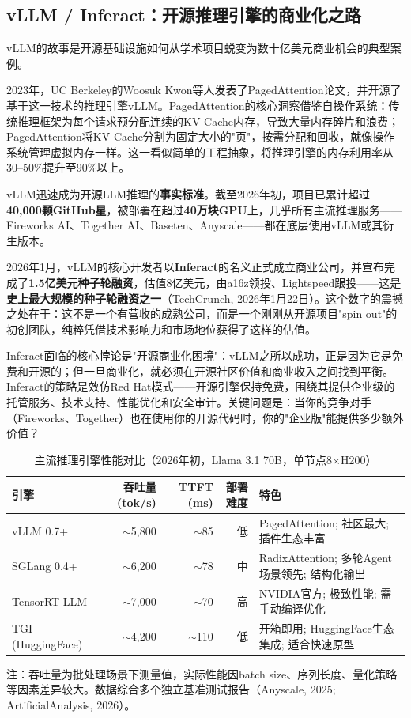 \subsection{vLLM / Inferact：开源推理引擎的商业化之路}
\label{subsec:vllm}

vLLM的故事是开源基础设施如何从学术项目蜕变为数十亿美元商业机会的典型案例。

2023年，UC Berkeley的Woosuk Kwon等人发表了PagedAttention论文，并开源了基于这一技术的推理引擎vLLM。PagedAttention的核心洞察借鉴自操作系统：传统推理框架为每个请求预分配连续的KV Cache内存，导致大量内存碎片和浪费；PagedAttention将KV Cache分割为固定大小的"页"，按需分配和回收，就像操作系统管理虚拟内存一样。这一看似简单的工程抽象，将推理引擎的内存利用率从30--50\%提升至90\%以上。

vLLM迅速成为开源LLM推理的\textbf{事实标准}。截至2026年初，项目已累计超过\textbf{40,000颗GitHub星}，被部署在超过\textbf{40万块GPU}上，几乎所有主流推理服务——Fireworks AI、Together AI、Baseten、Anyscale——都在底层使用vLLM或其衍生版本。

2026年1月，vLLM的核心开发者以\textbf{Inferact}的名义正式成立商业公司，并宣布完成了\textbf{1.5亿美元种子轮融资}，估值8亿美元，由a16z领投、Lightspeed跟投——这是\textbf{史上最大规模的种子轮融资之一}（TechCrunch, 2026年1月22日）。这个数字的震撼之处在于：这不是一个有营收的成熟公司，而是一个刚刚从开源项目"spin out"的初创团队，纯粹凭借技术影响力和市场地位获得了这样的估值。

Inferact面临的核心悖论是"开源商业化困境"：vLLM之所以成功，正是因为它是免费和开源的；但一旦商业化，就必须在开源社区价值和商业收入之间找到平衡。Inferact的策略是效仿Red Hat模式——开源引擎保持免费，围绕其提供企业级的托管服务、技术支持、性能优化和安全审计。关键问题是：当你的竞争对手（Fireworks、Together）也在使用你的开源代码时，你的"企业版"能提供多少额外价值？

\begin{table}[htbp]
\centering
\caption{主流推理引擎性能对比（2026年初，Llama 3.1 70B，单节点8$\times$H200）}
\label{tab:inference-engines}
\small
\begin{tabularx}{\textwidth}{l r r r X}
\toprule
\rowcolor{figLightGray}
\textbf{引擎} & \textbf{吞吐量 (tok/s)} & \textbf{TTFT (ms)} & \textbf{部署难度} & \textbf{特色} \\
\midrule
vLLM 0.7+        & $\sim$5,800 & $\sim$85  & 低   & PagedAttention; 社区最大; 插件生态丰富 \\
SGLang 0.4+      & $\sim$6,200 & $\sim$78  & 中   & RadixAttention; 多轮Agent场景领先; 结构化输出 \\
TensorRT-LLM     & $\sim$7,000 & $\sim$70  & 高   & NVIDIA官方; 极致性能; 需手动编译优化 \\
TGI (HuggingFace) & $\sim$4,200 & $\sim$110 & 低   & 开箱即用; HuggingFace生态集成; 适合快速原型 \\
\bottomrule
\end{tabularx}

\medskip
\noindent\small 注：吞吐量为批处理场景下测量值，实际性能因batch size、序列长度、量化策略等因素差异较大。数据综合多个独立基准测试报告（Anyscale, 2025; ArtificialAnalysis, 2026）。
\end{table}


